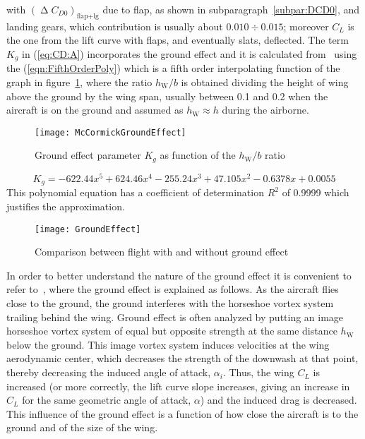 %
with $\left(\upDelta C_{D0}\right)_{\text{flap}+\text{lg}}$ due to flap, as shown in subparagraph~\ref{subpar:DCD0}, and landing gears, which contribution is usually about $0.010 \div 0.015$; moreover $C_L$ is the one from the lift curve with flaps, and eventually slats, deflected. The term $K_g$ in (\ref{eq:CD:A}) incorporates the ground effect and it is calculated from~\cite{McCormick} using the (\ref{eqn:FifthOrderPoly}) which is a fifth order interpolating function of the  graph in figure~\ref{fig:McCormickGroundEffect}, where the ratio $h_{\text{W}}/b$ is obtained dividing the height of wing above the ground by the wing span, usually between 0.1 and 0.2 when the aircraft is on the ground and assumed as $h_{\text{W}} \approx h$ during the airborne.
%
\begin{figure}[H]
\centering
\texttt{[image: McCormickGroundEffect]}
\caption{Ground effect parameter $K_g$ as function of the $h_{\text{W}}/b$ ratio}
\label{fig:McCormickGroundEffect}
\end{figure}
%
\begin{equation}
K_g=-622.44x^5+624.46x^4-255.24x^3+47.105x^2-0.6378x+0.0055
\label{eqn:FifthOrderPoly}
\end{equation}
%
This polynomial equation has a coefficient of determination $R^2$ of 0.9999 which justifies the approximation.
%
\begin{figure}[!t]
\centering
\texttt{[image: GroundEffect]}
\caption{Comparison between flight with and without ground effect}
\label{fig:GroundEffect}
\end{figure}

\bigskip
\noindent
In order to better understand the nature of the ground effect it is convenient to refer to~\cite{nicolai2010fundamentals}, where the ground effect is explained as follows.
%
As the aircraft flies close to the ground, the ground interferes with the horseshoe vortex system trailing behind the wing. Ground effect is often analyzed by putting an image horseshoe vortex system of equal but opposite strength at the same distance $h_{\text{W}}$ below the ground.
%
This image vortex system induces velocities at the wing aerodynamic center, which decreases the strength of the downwash at that point, thereby decreasing the induced angle of attack, $\alpha_i$. Thus, the wing $C_L$ is increased (or more correctly, the lift curve slope increases, giving an increase in $C_L$ for the same geometric angle of attack, $\alpha$) and the induced drag is decreased.
%
This influence of the ground effect is a function of how close the aircraft is to the ground and of the size of the wing.

